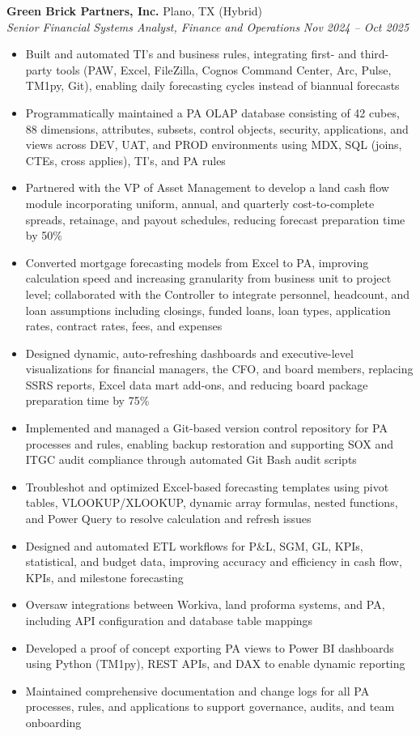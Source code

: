 \documentclass[a4paper,11pt]{article}
\begin{document}
\vspace{1mm}
\textbf{Green Brick Partners, Inc.} \hfill Plano, TX (Hybrid) \\
\textit{Senior Financial Systems Analyst, Finance and Operations} \hfill \textit{Nov 2024 -- Oct 2025}
\begin{itemize}
\item Built and automated TI's and business rules, integrating first- and third-party tools (PAW, Excel, FileZilla, Cognos Command Center, Arc, Pulse, TM1py, Git), enabling daily forecasting cycles instead of biannual forecasts
\item Programmatically maintained a PA OLAP database consisting of 42 cubes, 88 dimensions, attributes, subsets, control objects, security, applications, and views across DEV, UAT, and PROD environments using MDX, SQL (joins, CTEs, cross applies), TI's, and PA rules
\item Partnered with the VP of Asset Management to develop a land cash flow module incorporating uniform, annual, and quarterly cost-to-complete spreads, retainage, and payout schedules, reducing forecast preparation time by 50\%
\item Converted mortgage forecasting models from Excel to PA, improving calculation speed and increasing granularity from business unit to project level; collaborated with the Controller to integrate personnel, headcount, and loan assumptions including closings, funded loans, loan types, application rates, contract rates, fees, and expenses
\item Designed dynamic, auto-refreshing dashboards and executive-level visualizations for financial managers, the CFO, and board members, replacing SSRS reports, Excel data mart add-ons, and reducing board package preparation time by 75\%
\item Implemented and managed a Git-based version control repository for PA processes and rules, enabling backup restoration and supporting SOX and ITGC audit compliance through automated Git Bash audit scripts
\item Troubleshot and optimized Excel-based forecasting templates using pivot tables, VLOOKUP/XLOOKUP, dynamic array formulas, nested functions, and Power Query to resolve calculation and refresh issues
\item Designed and automated ETL workflows for P\&L, SGM, GL, KPIs, statistical, and budget data, improving accuracy and efficiency in cash flow, KPIs, and milestone forecasting
\item Oversaw integrations between Workiva, land proforma systems, and PA, including API configuration and database table mappings
\item Developed a proof of concept exporting PA views to Power BI dashboards using Python (TM1py), REST APIs, and DAX to enable dynamic reporting
\item Maintained comprehensive documentation and change logs for all PA processes, rules, and applications to support governance, audits, and team onboarding
\end{itemize}
\end{document}
